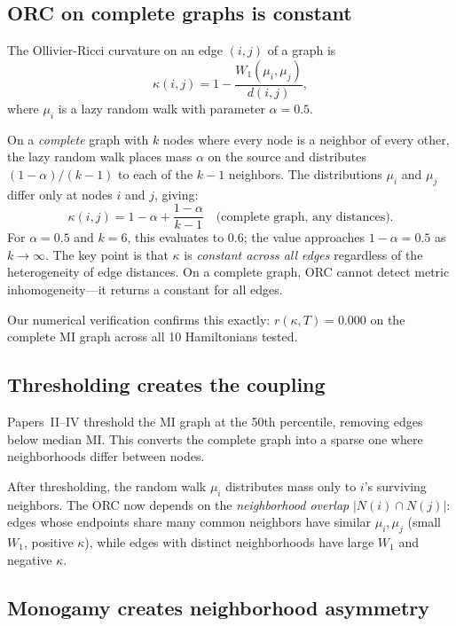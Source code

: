 \documentclass[aps,pra,twocolumn,superscriptaddress,floatfix]{revtex4-2}
\begin{document}
\subsection{ORC on complete graphs is constant}

The Ollivier-Ricci curvature on an edge $(i,j)$
of a graph is
\begin{equation}
\kappa(i,j) = 1 - \frac{W_1(\mu_i, \mu_j)}{d(i,j)},
\end{equation}
where $\mu_i$ is a lazy random walk with parameter
$\alpha = 0.5$.

On a \textit{complete} graph with $k$ nodes where every node is a
neighbor of every other, the lazy random walk places mass $\alpha$
on the source and distributes $(1-\alpha)/(k-1)$ to each of the
$k-1$ neighbors.  The distributions $\mu_i$ and $\mu_j$ differ
only at nodes $i$ and $j$, giving:
\begin{equation}
\kappa(i,j) = 1 - \alpha + \frac{1-\alpha}{k-1}
\quad \text{(complete graph, any distances)}.
\label{eq:orc_complete}
\end{equation}
For $\alpha = 0.5$ and $k = 6$, this evaluates to $0.6$;
the value approaches $1 - \alpha = 0.5$ as $k \to \infty$.
The key point is that $\kappa$ is \textit{constant across all edges}
regardless of the heterogeneity of edge distances.
On a complete graph, ORC cannot detect metric
inhomogeneity---it returns a constant for all edges.

Our numerical verification confirms this exactly:
$r(\kappa, T) = 0.000$ on the complete MI graph
across all 10 Hamiltonians tested.

\subsection{Thresholding creates the coupling}

Papers~II--IV threshold the MI graph at the 50th percentile,
removing edges below median MI.  This converts the
complete graph into a sparse one where neighborhoods
differ between nodes.

After thresholding, the random walk $\mu_i$ distributes
mass only to $i$'s surviving neighbors.  The ORC
now depends on the \textit{neighborhood overlap}
$|N(i) \cap N(j)|$: edges whose endpoints share
many common neighbors have similar $\mu_i, \mu_j$
(small $W_1$, positive $\kappa$), while edges with
distinct neighborhoods have large $W_1$ and negative $\kappa$.

\subsection{Monogamy creates neighborhood asymmetry}
\end{document}
